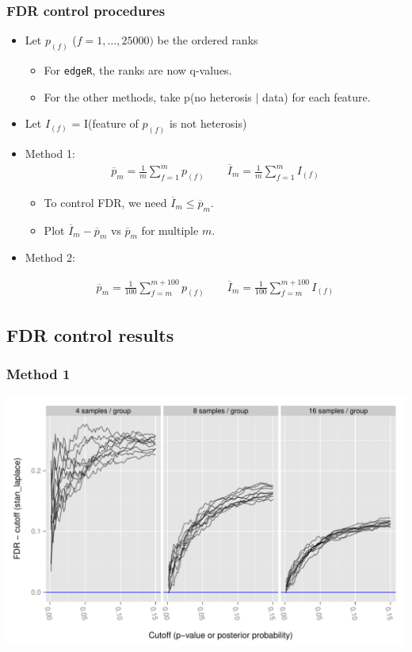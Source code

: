 \documentclass[handout]{beamer}
\providecommand{\ov}[1]{\overline{#1}}
\numberwithin{equation}{section}
\begin{document}
\begin{frame}
\frametitle{FDR control procedures}

\begin{itemize}
\item Let $p_{(f)}$ ($f = 1, \ldots, 25000)$ be the ordered ranks 
\begin{itemize}
\item For {\tt edgeR}, the ranks are now q-values.
\item For the other methods, take p(no heterosis $|$ data) for each feature.
\end{itemize}
\pause \item Let $I_{(f)}$ = I(feature of $p_{(f)}$ is not heterosis)
\item Method 1:
\begin{align*}
\ov{p}_m = \frac{1}{m} \sum_{f = 1}^m p_{(f)} \qquad \ov{I}_m = \frac{1}{m}\sum_{f = 1}^m I_{(f)}
\end{align*}
\begin{itemize}
\pause \item To control FDR, we need $\ov{I}_m \le \ov{p}_m$.
\item Plot $\ov{I}_m - \ov{p}_m$ vs $\ov{p}_m$ for multiple $m$.
\end{itemize}

\pause \item Method 2:

\begin{align*}
\ov{p}_m = \frac{1}{100} \sum_{f = m}^{m + 100} p_{(f)} \qquad \ov{I}_m = \frac{1}{100}\sum_{f = m}^{m + 100} I_{(f)}
\end{align*}
\end{itemize}
\end{frame}

\subsection{FDR control results}


\begin{frame}
\frametitle{Method 1}
\begin{center}
\includegraphics[scale=0.5]{fdr-method1stan}
\end{center}
\end{frame}
\end{document}
